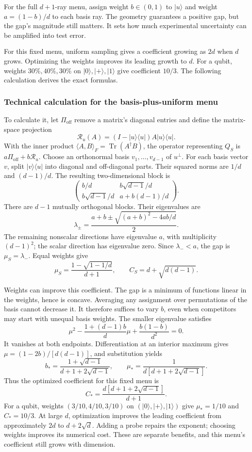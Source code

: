 \documentclass[11pt,a4paper]{article}
\newcommand{\ket}[1]{\lvert #1\rangle}
\newcommand{\bra}[1]{\langle #1\rvert}
\newcommand{\Tr}{\operatorname{Tr}}
\numberwithin{equation}{section}
\begin{document}
For the full $d+1$-ray menu, assign weight $b\in(0,1)$ to $\ket{u}$ and weight $a=(1-b)/d$ to each basis ray. The geometry guarantees a positive gap, but the gap's magnitude still matters. It sets how much experimental uncertainty can be amplified into test error.

For this fixed menu, uniform sampling gives a coefficient growing as $2d$
when $d$ grows. Optimizing the weights improves its leading growth to $d$.
For a qubit, weights $30\%,40\%,30\%$ on $\ket0,\ket+,\ket1$ give
coefficient $10/3$. The following calculation derives the exact formulas.

\subsubsection*{Technical calculation for the basis-plus-uniform menu}

To calculate it, let $\Pi_{\mathrm{off}}$ remove a matrix's diagonal entries and define the matrix-space projection
\[
\mathcal R_u(A)=(I-\ket{u}\bra{u})A\ket{u}\bra{u}.
\]
With the inner product $\langle A,B\rangle_F=\Tr(A^\dagger B)$, the operator representing $Q_S$ is $a\Pi_{\mathrm{off}}+b\mathcal R_u$. Choose an orthonormal basis $v_1,\ldots,v_{d-1}$ of $u^\perp$. For each basis vector $v$, split $\ket{v}\bra{u}$ into diagonal and off-diagonal parts. Their squared norms are $1/d$ and $(d-1)/d$. The resulting two-dimensional block is
\[
\begin{pmatrix}
b/d&b\sqrt{d-1}/d\\
b\sqrt{d-1}/d&a+b(d-1)/d
\end{pmatrix}.
\]
There are $d-1$ mutually orthogonal blocks. Their eigenvalues are
\[
\lambda_\pm=\frac{a+b\pm\sqrt{(a+b)^2-4ab/d}}{2}.
\]
The remaining nonscalar directions have eigenvalue $a$, with multiplicity $(d-1)^2$; the scalar direction has eigenvalue zero. Since $\lambda_-<a$, the gap is $\mu_S=\lambda_-$. Equal weights give
\[
\mu_S=\frac{1-\sqrt{1-1/d}}{d+1},\qquad
C_S=d+\sqrt{d(d-1)}.
\]

Weights can improve this coefficient. The gap is a minimum of functions linear in the weights, hence is concave. Averaging any assignment over permutations of the basis cannot decrease it. It therefore suffices to vary $b$, even when competitors may start with unequal basis weights. The smaller eigenvalue satisfies
\[
\mu^2-\frac{1+(d-1)b}{d}\mu+\frac{b(1-b)}{d^2}=0.
\]
It vanishes at both endpoints. Differentiation at an interior maximum gives $\mu=(1-2b)/[d(d-1)]$, and substitution yields
\[
b_* =\frac{1+\sqrt{d-1}}{d+1+2\sqrt{d-1}},\qquad
\mu_* =\frac{1}{d[d+1+2\sqrt{d-1}]}.
\]
Thus the optimized coefficient for this fixed menu is
\[
C_* =\frac{d[d+1+2\sqrt{d-1}]}{d+1}.
\]
For a qubit, weights $(3/10,4/10,3/10)$ on $(\ket{0},\ket{+},\ket{1})$ give $\mu_*=1/10$ and $C_*=10/3$. At large $d$, optimization improves the leading coefficient from approximately $2d$ to $d+2\sqrt d$. Adding a probe repairs the exponent; choosing weights improves its numerical cost. These are separate benefits, and this menu's coefficient still grows with dimension.
\end{document}
